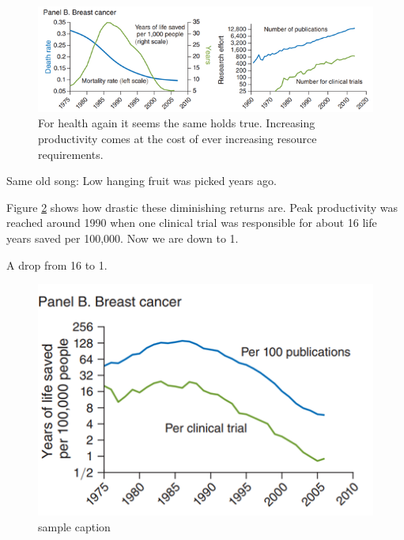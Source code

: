 \documentclass[
]{book}
\begin{document}
\begin{figure}

{\centering \includegraphics[width=1\linewidth]{img/growth/moore18} 

}

\caption{For health again it seems the same holds true. Increasing productivity comes at the cost of ever increasing resource requirements.}\label{fig:growth18}
\end{figure}

Same old song: Low hanging fruit was picked years ago.

Figure \ref{fig:growth19} shows how drastic these diminishing returns are. Peak productivity was reached around 1990 when one clinical trial was responsible for about 16 life years saved per 100,000. Now we are down to 1.

A drop from 16 to 1.

\begin{figure}

{\centering \includegraphics[width=1\linewidth]{img/growth/moore19} 

}

\caption{sample caption}\label{fig:growth19}
\end{figure}
\end{document}

